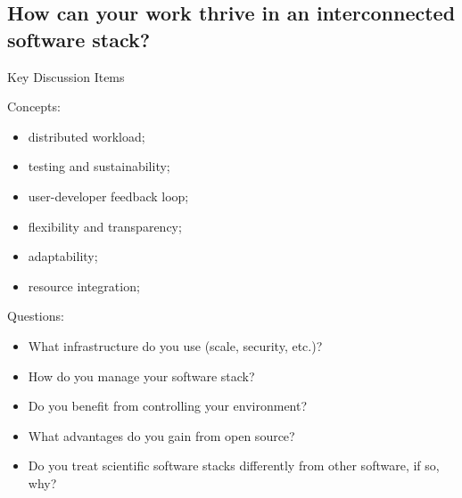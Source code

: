 		\subsection{How can your work thrive in an interconnected software stack?}
			\begin{frame}{Key Discussion Items}
				\begin{minipage}{.35\textwidth}
					Concepts:
					\begin{itemize}
						\item distributed workload;
						\item testing and sustainability;
						\item user-developer feedback loop;
						\item flexibility and transparency;
						\item adaptability;
						\item resource integration;
					\end{itemize}
				\end{minipage}
				\begin{minipage}{.56\textwidth}
					Questions:
					\begin{itemize}
						\item What infrastructure do you use (scale, security, etc.)?
						\item How do you manage your software stack?
						\item Do you benefit from controlling your environment?
						\item What advantages do you gain from open source?
						\item Do you treat scientific software stacks differently from other software, if so, why?
					\end{itemize}
				\end{minipage}
			\end{frame}

